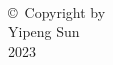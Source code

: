 \thispagestyle{empty}
\hbox{\ }

\vfill
\renewcommand{\baselinestretch}{1}

\vspace{.5in}

\begin{center}
\large{
    \copyright\ Copyright by \\
    Yipeng Sun  \\
    2023
}
\end{center}

\vfill
\newpage
